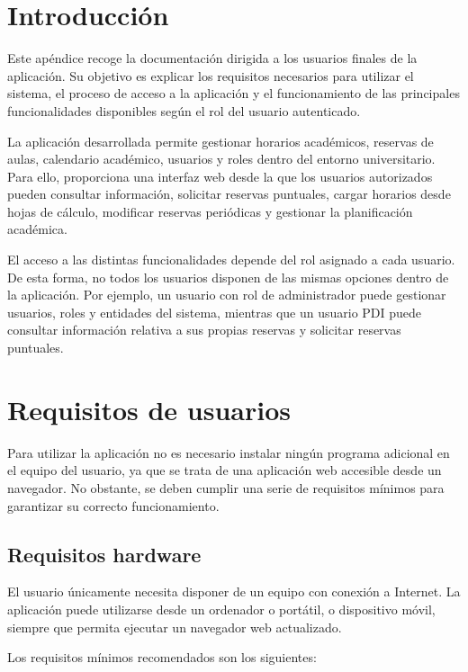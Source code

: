 
\section{Introducción}

Este apéndice recoge la documentación dirigida a los usuarios finales de la aplicación. Su objetivo es explicar los requisitos necesarios para utilizar el sistema, el proceso de acceso a la aplicación y el funcionamiento de las principales funcionalidades disponibles según el rol del usuario autenticado.

La aplicación desarrollada permite gestionar horarios académicos, reservas de aulas, calendario académico, usuarios y roles dentro del entorno universitario. Para ello, proporciona una interfaz web desde la que los usuarios autorizados pueden consultar información, solicitar reservas puntuales, cargar horarios desde hojas de cálculo, modificar reservas periódicas y gestionar la planificación académica.

El acceso a las distintas funcionalidades depende del rol asignado a cada usuario. De esta forma, no todos los usuarios disponen de las mismas opciones dentro de la aplicación. Por ejemplo, un usuario con rol de administrador puede gestionar usuarios, roles y entidades del sistema, mientras que un usuario PDI puede consultar información relativa a sus propias reservas y solicitar reservas puntuales.

\section{Requisitos de usuarios}

Para utilizar la aplicación no es necesario instalar ningún programa adicional en el equipo del usuario, ya que se trata de una aplicación web accesible desde un navegador. No obstante, se deben cumplir una serie de requisitos mínimos para garantizar su correcto funcionamiento.

\subsection{Requisitos hardware}

El usuario únicamente necesita disponer de un equipo con conexión a Internet. La aplicación puede utilizarse desde un ordenador o portátil, o dispositivo móvil, siempre que permita ejecutar un navegador web actualizado.

Los requisitos mínimos recomendados son los siguientes:

